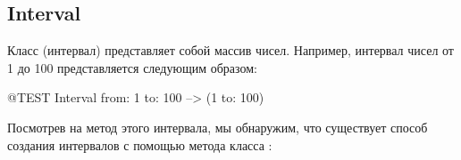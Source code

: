\documentclass[a4paper,10pt,twoside]{book}
\begin{document}





\subsection{Interval}
Класс  (интервал) представляет собой массив чисел. Например, интервал чисел от 1 до 100 представляется следующим образом:
\begin{code}{@TEST}
Interval from: 1 to: 100 --> (1 to: 100)
\end{code}

\noindent
Посмотрев на метод  этого интервала, мы обнаружим, что существует способ создания интервалов с помощью метода  класса :
\end{document}
